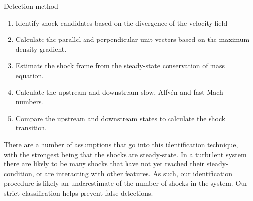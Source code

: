 \documentclass[10pt,aspectratio=169,usenames,dvipsnames]{beamer}
\begin{document}
\begin{frame}{Detection method}
\begin{enumerate}
    \item Identify shock candidates based on the divergence of the velocity field 
    \item Calculate the parallel and perpendicular unit vectors based on the maximum density gradient.
    \item Estimate the shock frame from the steady-state conservation of mass equation. 
    \item Calculate the upstream and downstream slow, Alfv\'en and fast Mach numbers. 
    \item Compare the upstream and downstream states to calculate the shock transition. 
\end{enumerate}

There are a number of assumptions that go into this identification technique, with the strongest being that the shocks are steady-state. In a turbulent system there are likely to be many shocks that have not yet reached their steady-condition, or are interacting with other features. As such, our identification procedure is likely an underestimate of the number of shocks in the system. Our strict classification helps prevent false detections.
\end{frame}
\end{document}
